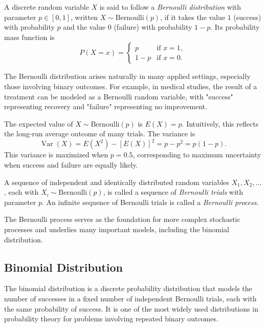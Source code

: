 \begin{definition}
A discrete random variable $X$ is said to follow a \emph{Bernoulli distribution} with parameter $p \in [0,1]$, written $X \sim \text{Bernoulli}(p)$, if it takes the value $1$ (success) with probability $p$ and the value $0$ (failure) with probability $1-p$. Its probability mass function is
\[
P(X = x) =
\begin{cases} 
p & \text{if } x = 1, \\[6pt]
1 - p & \text{if } x = 0.
\end{cases}
\]
\end{definition}

The Bernoulli distribution arises naturally in many applied settings, especially those involving binary outcomes. For example, in medical studies, the result of a treatment can be modeled as a Bernoulli random variable, with "success" representing recovery and "failure" representing no improvement.

The expected value of $X \sim \text{Bernoulli}(p)$ is $E(X) = p$. Intuitively, this reflects the long-run average outcome of many trials. The variance is
\[
\operatorname{Var}(X) = E(X^2) - [E(X)]^2 = p - p^2 = p(1-p).
\]
This variance is maximized when $p = 0.5$, corresponding to maximum uncertainty when success and failure are equally likely.

\begin{definition}
A sequence of independent and identically distributed random variables $X_{1}, X_{2}, \ldots$, each with $X_i \sim \text{Bernoulli}(p)$, is called a sequence of \emph{Bernoulli trials} with parameter $p$. An infinite sequence of Bernoulli trials is called a \emph{Bernoulli process}.
\end{definition}

The Bernoulli process serves as the foundation for more complex stochastic processes and underlies many important models, including the binomial distribution.

%
%

\subsection{Binomial Distribution}

The binomial distribution is a discrete probability distribution that models the number of successes in a fixed number of independent Bernoulli trials, each with the same probability of success. It is one of the most widely used distributions in probability theory for problems involving repeated binary outcomes.

